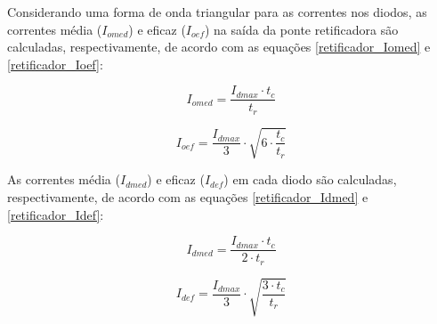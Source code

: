 \begin{apendicesenv}
    
    

    
Considerando uma forma de onda triangular para as correntes nos diodos, as correntes média ($I_{omed}$) e eficaz ($I_{oef}$) na saída da ponte retificadora são calculadas, respectivamente, de acordo com as equações \ref{retificador_Iomed} e \ref{retificador_Ioef}:
    
    \begin{equation}
        I_{omed} = \frac{I_{dmax} \cdot t_{c}}{t_{r}}
        \label{retificador_Iomed}
    \end{equation}
    
    \begin{equation}
        I_{oef} = \frac{I_{dmax}}{3} \cdot \sqrt{6 \cdot \frac{t_{c}}{t_{r}}}
        \label{retificador_Ioef}
    \end{equation}
    
As correntes média ($I_{dmed}$) e eficaz ($I_{def}$) em cada diodo são calculadas, respectivamente, de acordo com as equações \ref{retificador_Idmed} e \ref{retificador_Idef}:
    
    \begin{equation}
        I_{dmed} = \frac{I_{dmax} \cdot t_{c}}{2 \cdot t_{r}}
        \label{retificador_Idmed}
    \end{equation}
    
    \begin{equation}
        I_{def} = \frac{I_{dmax}}{3} \cdot \sqrt{\frac{3 \cdot t_{c}}{t_{r}}}
        \label{retificador_Idef}
    \end{equation}


\end{apendicesenv}
